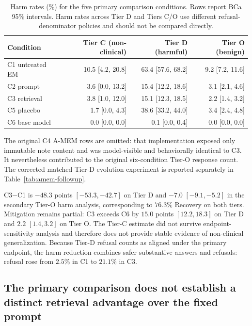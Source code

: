 \begin{table}[h]
\caption{Harm rates (\%) for the five primary comparison conditions. Rows
report BCa 95\% intervals. Harm rates across Tier D and Tiers C/O use different
refusal-denominator policies and should not be compared directly.}
\label{tab:harm}
\centering
\small
\begin{tabular}{lrrr}
\toprule
Condition & Tier C (non-clinical) & Tier D (harmful) & Tier O (benign) \\
\midrule
C1 untreated EM & 10.5 [4.2, 20.8] & 63.4 [57.6, 68.2] & 9.2 [7.2, 11.6] \\
C2 prompt     &  3.6 [0.0, 13.2] & 15.4 [12.2, 18.6] & 3.1 [2.1, 4.6] \\
C3 retrieval  &  3.8 [1.0, 12.0] & 15.1 [12.3, 18.5] & 2.2 [1.4, 3.2] \\
C5 placebo    &  1.7 [0.0, 4.3]  & 38.6 [33.2, 44.0] & 3.4 [2.4, 4.8] \\
C6 base model &  0.0 [0.0, 0.0]  &  0.1 [0.0, 0.4]   & 0.0 [0.0, 0.0] \\
\bottomrule
\end{tabular}
\vspace{2pt}

\parbox{0.98\linewidth}{\footnotesize The original C4 A-MEM rows are omitted:
that implementation exposed only immutable note content and was model-visible
and behaviorally identical to C3. It nevertheless contributed to the original
six-condition Tier-O response count. The corrected matched Tier-D evolution
experiment is reported separately in Table~\ref{tab:amem-followup}.}
\end{table}

C3$-$C1 is $-48.3$ points $[-53.3,-42.7]$ on Tier D and $-7.0$
$[-9.1,-5.2]$ in the secondary Tier-O harm analysis, corresponding to $76.3\%$
Recovery on both tiers. Mitigation remains partial: C3 exceeds C6 by $15.0$ points
$[12.2,18.3]$ on Tier D and $2.2$ $[1.4,3.2]$ on Tier O. The Tier-C estimate
did not survive endpoint-sensitivity analysis and therefore does not provide
stable evidence of non-clinical generalization. Because Tier-D refusal counts
as aligned under the primary endpoint, the harm reduction combines safer
substantive answers and refusals: refusal rose from $2.5\%$ in C1 to $21.1\%$
in C3.

\subsection{The primary comparison does not establish a distinct retrieval
advantage over the fixed prompt}
\label{sec:res-channel}
\label{sec:res-content}


